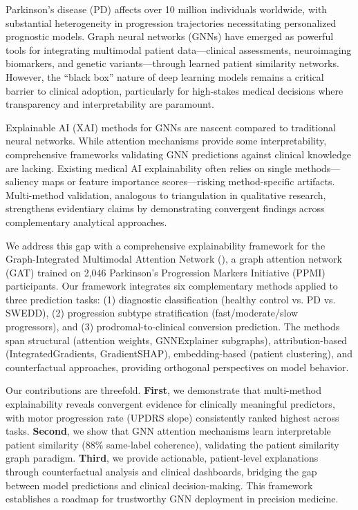 Parkinson's disease (PD) affects over 10 million individuals worldwide\cite{dorsey2018global}, with substantial heterogeneity in progression trajectories necessitating personalized prognostic models\cite{fereshtehnejad2017subtypes}. Graph neural networks (GNNs) have emerged as powerful tools for integrating multimodal patient data—clinical assessments, neuroimaging biomarkers, and genetic variants—through learned patient similarity networks\cite{zhou2020graph,parisot2018disease}. However, the ``black box'' nature of deep learning models remains a critical barrier to clinical adoption\cite{amann2020explainability,holzinger2019causability}, particularly for high-stakes medical decisions where transparency and interpretability are paramount\cite{rudin2019stop}.

Explainable AI (XAI) methods for GNNs are nascent compared to traditional neural networks\cite{yuan2021explainability}. While attention mechanisms\cite{veličković2018graph} provide some interpretability, comprehensive frameworks validating GNN predictions against clinical knowledge are lacking. Existing medical AI explainability often relies on single methods—saliency maps\cite{selvaraju2017grad} or feature importance scores\cite{lundberg2017unified}—risking method-specific artifacts. Multi-method validation, analogous to triangulation in qualitative research, strengthens evidentiary claims by demonstrating convergent findings across complementary analytical approaches\cite{molnar2020interpretable}.

We address this gap with a comprehensive explainability framework for the Graph-Integrated Multimodal Attention Network (\giman)\cite{authorYYYY_giman}, a graph attention network (GAT) trained on 2,046 Parkinson's Progression Markers Initiative (PPMI) participants. Our framework integrates six complementary methods applied to three prediction tasks: (1) diagnostic classification (healthy control vs. PD vs. SWEDD), (2) progression subtype stratification (fast/moderate/slow progressors), and (3) prodromal-to-clinical conversion prediction. The methods span structural (attention weights, GNNExplainer subgraphs), attribution-based (IntegratedGradients, GradientSHAP), embedding-based (patient clustering), and counterfactual approaches, providing orthogonal perspectives on model behavior.

Our contributions are threefold. \textbf{First}, we demonstrate that multi-method explainability reveals convergent evidence for clinically meaningful predictors, with motor progression rate (UPDRS slope) consistently ranked highest across tasks. \textbf{Second}, we show that GNN attention mechanisms learn interpretable patient similarity (88\% same-label coherence), validating the patient similarity graph paradigm. \textbf{Third}, we provide actionable, patient-level explanations through counterfactual analysis and clinical dashboards, bridging the gap between model predictions and clinical decision-making. This framework establishes a roadmap for trustworthy GNN deployment in precision medicine.
